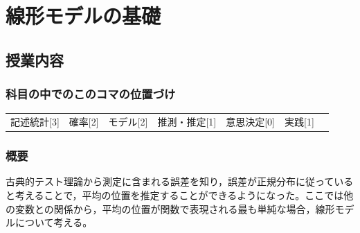 \section{線形モデルの基礎}
\label{lesson08}

\subsection{授業内容}
\subsubsection{科目の中でのこのコマの位置づけ}
\begin{tabular}[t]{ccccccc}
    記述統計[3] & 確率[2] & モデル[2] & 推測・推定[1] & 意思決定[0] & 実践[1]
\end{tabular}

\subsubsection{概要}
古典的テスト理論から測定に含まれる誤差を知り，誤差が正規分布に従っていると考えることで，平均の位置を推定することができるようになった。ここでは他の変数との関係から，平均の位置が関数で表現される最も単純な場合，線形モデルについて考える。

